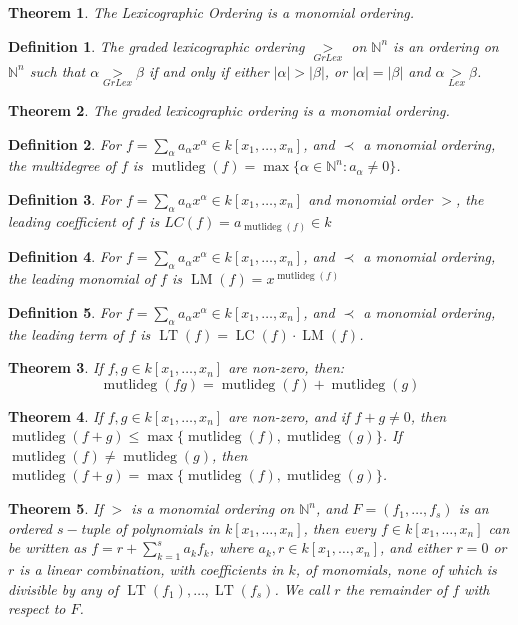 \documentclass[oneside]{book}
\theoremstyle{mystyle}
\newtheorem{theorem}{Theorem}[section]
\newtheorem{definition}{Definition}[section]
\DeclareMathOperator{\multideg}{mutlideg}
\DeclareMathOperator{\LC}{LC}
\DeclareMathOperator{\LT}{LT}
\DeclareMathOperator{\LM}{LM}
\begin{document}
\begin{theorem}
The Lexicographic Ordering is a monomial ordering.
\end{theorem}
\begin{definition}
The graded lexicographic ordering $\underset{GrLex}{>}$ on $\mathbb{N}^n$ is an ordering on $\mathbb{N}^n$ such that $\alpha \underset{GrLex}{>}\beta$ if and only if either $|\alpha|>|\beta|$, or $|\alpha| = |\beta|$ and $\alpha \underset{Lex}{>}\beta$.
\end{definition}
\begin{theorem}
The graded lexicographic ordering is a monomial ordering.
\end{theorem}
\begin{definition}
For $f=\sum_{\alpha} a_{\alpha} x^\alpha \in k[x_1,\hdots ,x_n]$, and $\prec$ a monomial ordering, the multidegree of $f$ is $\multideg(f) = \max\{\alpha\in\mathbb{N}^n: a_{\alpha} \ne 0\}$.
\end{definition}
\begin{definition}
For $f=\sum_{\alpha}a_\alpha x^\alpha \in k[x_1,\hdots ,x_n]$ and monomial order $>$, the leading coefficient of $f$ is $LC(f) =a_{\multideg(f)}\in k$
\end{definition}
\begin{definition}
For $f=\sum_{\alpha} a_{\alpha} x^\alpha \in k[x_1,\hdots ,x_n]$, and $\prec$ a monomial ordering, the leading monomial of $f$ is $\LM(f) = x^{\multideg(f)}$
\end{definition}
\begin{definition}
For $f=\sum_{\alpha} a_{\alpha} x^{\alpha} \in k[x_1,\hdots ,x_n]$, and $\prec$ a monomial ordering, the leading term of $f$ is $\LT(f) = \LC(f)\cdot \LM(f)$.
\end{definition}
\begin{theorem}
If $f,g\in k[x_1,\hdots ,x_n]$ are non-zero, then:
\begin{equation*}
    \multideg(fg) = \multideg(f)+\multideg(g)
\end{equation*}
\end{theorem}
\begin{theorem}
If $f,g\in k[x_1,\hdots ,x_n]$ are non-zero, and if $f+g \ne 0$, then $\multideg(f+g) \leq \max\{\multideg(f),\multideg(g)\}$. If $\multideg(f)\ne \multideg(g)$, then $\multideg(f+g) = \max\{\multideg(f),\multideg(g)\}$.
\end{theorem}
\begin{theorem}
If $>$ is a monomial ordering on $\mathbb{N}^n$, and $F = (f_1,\hdots, f_s)$ is an ordered $s-$tuple of polynomials in $k[x_1,\hdots ,x_n]$, then every $f\in k[x_1,\hdots ,x_n]$ can be written as $f = r+\sum_{k=1}^{s} a_k f_k$, where $a_k,r\in k[x_1,\hdots ,x_n]$, and either $r=0$ or $r$ is a linear combination, with coefficients in $k$, of monomials, none of which is divisible by any of $\LT(f_1),\hdots, \LT(f_s)$. We call $r$ the remainder of $f$ with respect to $F$.
\end{theorem}
\end{document}
